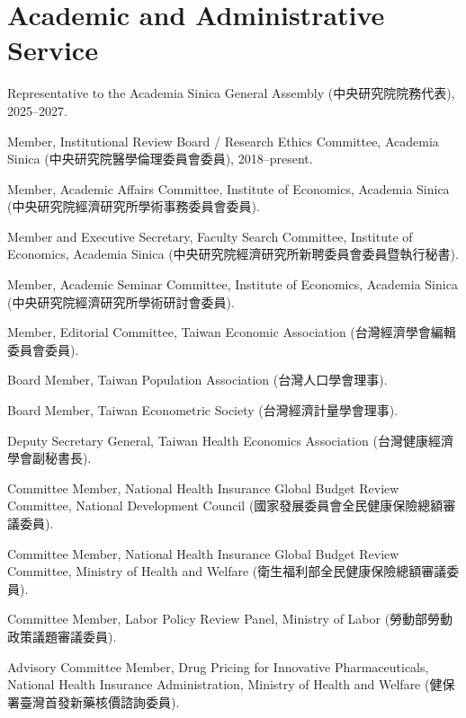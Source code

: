 \documentclass[10pt,letterpaper]{article}
\renewenvironment{itemize}{
  \begin{list}{}{
      \setlength{\leftmargin}{1.5em}
      \setlength{\itemsep}{0.25em}
      \setlength{\parskip}{0pt}
      \setlength{\parsep}{0.25em}
    }
}{
  \end{list}
}
\begin{document}
\section*{\textbf{Academic and Administrative Service}}

\begin{itemize}
  \item Representative to the Academia Sinica General Assembly (中央研究院院務代表), 2025--2027.
  
  \item Member, Institutional Review Board / Research Ethics Committee, Academia Sinica  
  (中央研究院醫學倫理委員會委員), 2018--present.
  
  \item Member, Academic Affairs Committee,  
  Institute of Economics, Academia Sinica  
  (中央研究院經濟研究所學術事務委員會委員).
  
  \item Member and Executive Secretary, Faculty Search Committee,  
  Institute of Economics, Academia Sinica  
  (中央研究院經濟研究所新聘委員會委員暨執行秘書).
  
  \item Member, Academic Seminar Committee,  
  Institute of Economics, Academia Sinica  
  (中央研究院經濟研究所學術研討會委員).
  
  \item Member, Editorial Committee, Taiwan Economic Association  
  (台灣經濟學會編輯委員會委員).
  
  \item Board Member, Taiwan Population Association  
  (台灣人口學會理事).
  
  \item Board Member, Taiwan Econometric Society  
  (台灣經濟計量學會理事).
  
  \item Deputy Secretary General, Taiwan Health Economics Association  
  (台灣健康經濟學會副秘書長).
  
  \item Committee Member, National Health Insurance Global Budget Review Committee,  
  National Development Council  
  (國家發展委員會全民健康保險總額審議委員).
  
  \item Committee Member, National Health Insurance Global Budget Review Committee,  
  Ministry of Health and Welfare  
  (衛生福利部全民健康保險總額審議委員).
  
  \item Committee Member, Labor Policy Review Panel, Ministry of Labor  
  (勞動部勞動政策議題審議委員).
  
  \item Advisory Committee Member, Drug Pricing for Innovative Pharmaceuticals,  
  National Health Insurance Administration, Ministry of Health and Welfare  
  (健保署臺灣首發新藥核價諮詢委員).
\end{itemize}
\end{document}

